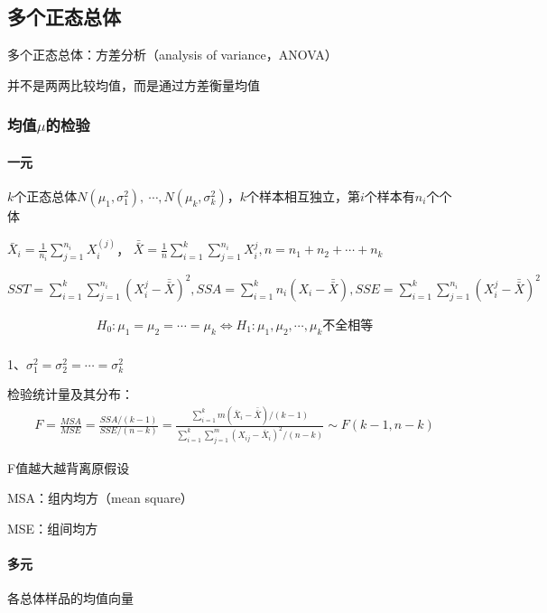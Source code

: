 \documentclass[12pt]{book}
\begin{document}
\subsection{多个正态总体}






多个正态总体：方差分析（analysis of variance，ANOVA）

并不是两两比较均值，而是通过方差衡量均值

\subsubsection{均值$\mu$的检验}

\paragraph{一元}
$k$个正态总体$N\left(\mu_1,\sigma_1^2\right),\ \cdots,N\left(\mu_k,\sigma_k^2\right)$，$k$个样本相互独立，第$i$个样本有$n_i$个个体

${\bar{X}}_i=\frac{1}{n_i}\sum_{j=1}^{n_i}X_i^{(j)}$，
$\bar{\bar{X}}=\frac{1}{n}\sum_{i=1}^{k}\sum_{j=1}^{n_i}{X_i^j},n=n_1+n_2+\cdots+n_k$

$
    SST=\sum_{i=1}^{k}\sum_{j=1}^{n_i}{\left(X_i^j-\bar{\bar{X}}\right)^2}, SSA=\sum_{i=1}^{k}n_i\left(X_i-\bar{\bar{X}}\right) , SSE=\sum_{i=1}^{k}\sum_{j=1}^{n_i}{\left(X_i^j-\bar{\bar{X}}\right)^2}
$

\begin{gather*}
    H_0:\mu_1=\mu_2=\cdots=\mu_k\Leftrightarrow H_1:\mu_1,\mu_2,\cdots,\mu_k\text{不全相等} \\
\end{gather*}


1、$\sigma_1^2=\sigma_2^2=\cdots=\sigma_k^2$

检验统计量及其分布：
\begin{gather*}
    F =\frac{MSA}{MSE} =\frac{SSA/(k-1)}{SSE/(n-k)} =\frac{\sum_{i=1}^{k}{m(\bar{X}_i-\bar{\bar{X}})/(k-1)}}{\sum_{i=1}^{k}\sum_{j=1}^{m}{(X_{ij}-\bar{X}_i)^2/(n-k)}} \sim F(k-1,n-k)
\end{gather*}

\par F值越大越背离原假设
\par MSA：组内均方（mean square）
\par MSE：组间均方

\paragraph{多元}
各总体样品的均值向量
\end{document}
